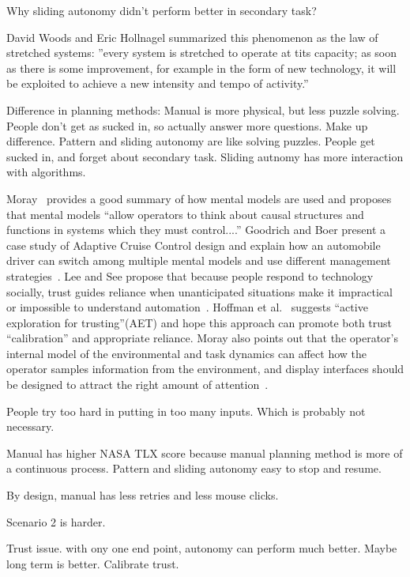 \documentclass[journal]{IEEEtran}
\begin{document}
Why sliding autonomy didn't perform better in secondary task?

David Woods and Eric Hollnagel summarized this phenomenon as the law of stretched systems: ''every system is stretched to operate at tits capacity; as soon as there is some improvement, for example in the form of new technology, it will be exploited to achieve a new intensity and tempo of activity.''  ~\cite{Woods2006Joint}

Difference in planning methods: 
Manual is more physical, but less puzzle solving. People don't get as sucked in, so actually answer more questions. Make up difference.
Pattern and sliding autonomy are like solving puzzles. People get sucked in, and forget about secondary task.
Sliding autnomy has more interaction with algorithms.


Moray~\cite{Moray1999Mental} provides a good summary of how mental models are used and proposes that mental models ``allow operators to think about causal structures and functions in systems which they must control....'' Goodrich and Boer present a case study of Adaptive Cruise Control design and explain how an automobile driver can switch among multiple mental models and use different management strategies~\cite{Goodrich2002Multiple, Goodrich2003Model}. Lee and See propose that because people respond to technology socially, trust guides reliance when unanticipated situations make it impractical or impossible to understand automation~\cite{Lee2004Trust}. Hoffman et al.\ \cite{Hoffman2013Trust} suggests ``active exploration for trusting''(AET) and hope this approach can promote both trust ``calibration'' and appropriate reliance. Moray also points out that the operator's internal model of the environmental and task dynamics can affect how the operator samples information from the environment, and display interfaces should be designed to attract the right amount of attention~\cite{Moray1990Designing}.

People try too hard in putting in too many inputs. Which is probably not necessary.

Manual has higher NASA TLX score because manual planning method is more of a continuous process. Pattern and sliding autonomy easy to stop and resume.

By design, manual has less retries and less mouse clicks.

Scenario 2 is harder.

Trust issue. with ony one end point, autonomy can perform much better. Maybe long term is better. Calibrate trust.
\end{document}
